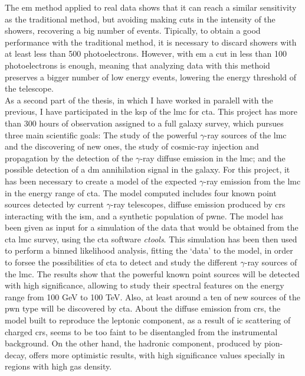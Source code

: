 \documentclass[main.tex]{subfiles}
\begin{document}
The \gls{em} method applied to real data shows that it can reach a similar sensitivity as the traditional method, but avoiding making cuts in the intensity of the showers, recovering a big number of events. Tipically, to obtain a good performance with the traditional method, it is necessary to discard showers with at least less than 500 photoelectrons. However, with \gls{em} a cut in less than 100 photoelectrons is enough, meaning that analyzing data with this methoid preserves a bigger number of low energy events, lowering the energy threshold of the telescope.\\

As a second part of the thesis, in which I have worked in paralell with the previous, I have participated in the \gls{ksp} of the \gls{lmc} for \gls{cta}. This project has more than 300 hours of observation assigned to a full galaxy survey, which pursues three main scientific goals: The study of the powerful $\gamma$-ray sources of the \gls{lmc} and the discovering of new ones, the study of cosmic-ray injection and propagation by the detection of the $\gamma$-ray diffuse emission in the \gls{lmc}; and the possible detection of a \gls{dm} annihilation signal in the galaxy. For this project, it has been necessary to create a model of the expected $\gamma$-ray emission from the \gls{lmc} in the energy range of \gls{cta}. The model computed includes four known point sources detected by current $\gamma$-ray telescopes, diffuse emission produced by \glspl{cr} interacting with the \gls{ism}, and a synthetic population of \gls{pwne}. The model has been given as input for a simulation of the data that would be obtained from the \gls{cta} \gls{lmc} survey, using the \gls{cta} software \textit{ctools}. This simulation has been then used to perform a binned likelihood analysis, fitting the `data' to the model, in order to forsee the possibilities of \gls{cta} to detect and study the different $\gamma$-ray sources of the \gls{lmc}. The results show that the powerful known point sources will be detected with high significance, allowing to study their spectral features on the energy range from 100 GeV to 100 TeV. Also, at least around a ten of new sources of the \gls{pwn} type will be discovered by \gls{cta}. About the diffuse emission from \glspl{cr}, the model built to reproduce the leptonic component, as a result of \gls{ic} scattering of charged \glspl{cr}, seems to be too faint to be disentangled from the instrumental background. On the other hand, the hadronic component, produced by pion-decay, offers more optimistic results, with high significance values specially in regions with high gas density.\\
\end{document}

